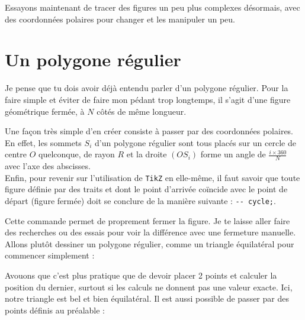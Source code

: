 Essayons maintenant de tracer des figures un peu plus complexes désormais, avec des coordonnées polaires pour changer et les manipuler un peu.

\section{Un polygone régulier}

Je pense que tu dois avoir déjà entendu parler d'un polygone régulier. Pour la faire simple et éviter de faire mon pédant trop longtemps, il s'agit d'une figure géométrique fermée, à $N$ côtés de même longueur. 

Une façon très simple d'en créer consiste à passer par des coordonnées polaires. En effet, les sommets $S_i$ d'un polygone régulier sont tous placés sur un cercle de centre $O$ quelconque, de rayon $R$ et la droite $(OS_i)$ forme un angle de $\frac{i \times 360}{N}$ avec l'axe des abscisses. \\

Enfin, pour revenir sur l'utilisation de \texttt{TikZ} en elle-même, il faut savoir que toute figure définie par des traits et dont le point d'arrivée coïncide avec le point de départ (figure fermée) doit se conclure de la manière suivante : \verb?-- cycle;?.

Cette commande permet de proprement fermer la figure. Je te laisse aller faire des recherches ou des essais pour voir la différence avec une fermeture manuelle. Allons plutôt dessiner un polygone régulier, comme un triangle équilatéral pour commencer simplement :


Avouons que c'est plus pratique que de devoir placer 2 points et calculer la position du dernier, surtout si les calculs ne donnent pas une valeur exacte. Ici, notre triangle est bel et bien équilatéral. Il est aussi possible de passer par des points définis au préalable :

